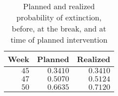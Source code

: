 \begin{table}[!tbp]
\caption{Planned and realized probability of extinction, before, at the break, and
      at time of planned intervention\label{tab:min}} 
\begin{center}
\begin{tabular}{rrr}
\hline\hline
\multicolumn{1}{c}{Week}&\multicolumn{1}{c}{Planned}&\multicolumn{1}{c}{Realized}\tabularnewline
\hline
$45$&$0.3410$&$0.3410$\tabularnewline
$47$&$0.5070$&$0.5124$\tabularnewline
$50$&$0.6635$&$0.7120$\tabularnewline
\hline
\end{tabular}\end{center}
\end{table}
